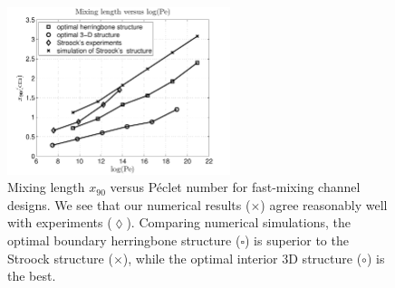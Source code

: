 \documentclass[times]{fldauth}
\begin{document}
  \begin{figure}
    \centerline{
      \includegraphics[width=0.58\textwidth,trim=10 0 10 22,clip]{example2mixinglength2}
    }
    \caption{\label{example2mixinglength} Mixing length $x_{90}$
      versus P\'eclet number for fast-mixing channel designs. We see
      that our numerical results ($\times$) agree reasonably well with
      experiments ($\lozenge$). Comparing numerical simulations, the
      optimal boundary herringbone structure ($\square$) is superior
      to the Stroock structure ($\times$), while the optimal interior
      3D structure ($\circ$) is the best.}
  \end{figure}
\end{document}
